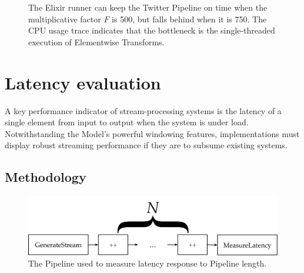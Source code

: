 \begin{figure}
{		
		\label{fig:eval:twitter:throughput:750}
	}
	\caption[Watermark and CPU traces of the Elixir runner executing the Twitter Pipeline at two different values of the multiplicative factor.]{The Elixir runner can keep the Twitter Pipeline on time when the multiplicative factor $F$ is \num{500}, but falls behind when it is \num{750}. The CPU usage trace indicates that the bottleneck is the single-threaded execution of Elementwise Transforms.}
	\label{fig:eval:twitter:throughput}
\end{figure}


\section{Latency evaluation}\label{sec:eval:latency}

A key performance indicator of stream-processing systems is the latency of a single element from input to output when the system is under load.
Notwithstanding the Model's powerful windowing features, implementations must display robust streaming performance if they are to subsume existing systems.

\subsection{Methodology}

\begin{figure}
	\includegraphics[width=\textwidth]{images/diags/eval-latency-pipeline}
	\caption[The Pipeline used in the latency experiment.]{The Pipeline used to measure latency response to Pipeline length.}
	\label{fig:eval:latency:pipeline-dag}
\end{figure}


